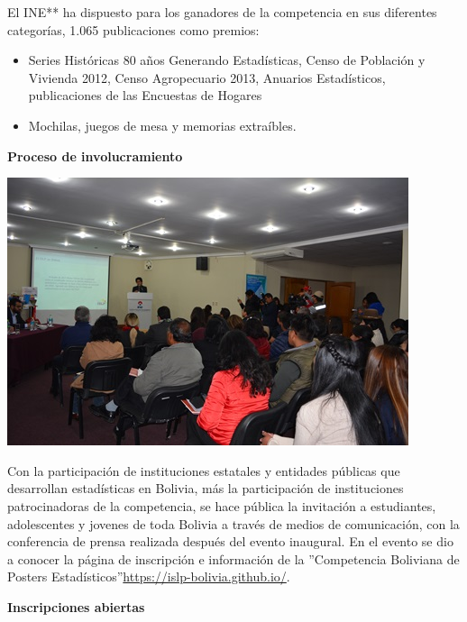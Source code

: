 \documentclass[8pt,a4paper]{article} %
\newcommand{\NewsItem}[1]{ %
\usefont{T1}{fvs}{n}{n} %
\vspace{24pt}\large #1\vspace{3pt} %
\par \normalsize \normalfont}
\begin{document}
\begin{multicols}{2}
El INE** ha dispuesto para los ganadores de la competencia en sus diferentes categorías, 1.065
 publicaciones como premios: 

\begin{multicols}{2}
\begin{small}
\begin{itemize}
\item Series Históricas 80 años Generando Estadísticas, Censo de Población y Vivienda 2012, Censo Agropecuario 2013, Anuarios Estadísticos, publicaciones de las Encuestas de Hogares
\item Mochilas, juegos de mesa y memorias extraíbles.
\end{itemize}
\end{small}
\end{multicols}

\NewsItem{\textbf{Proceso de involucramiento}}

\begin{center}
\includegraphics[scale=0.15]{foto4.jpg} %
\end{center}

Con la participación de instituciones estatales y entidades públicas que desarrollan estadísticas en Bolivia, más la participación de instituciones patrocinadoras de la competencia, se hace pública la invitación a estudiantes, adolescentes y jovenes de toda Bolivia a través de medios de comunicación, con la conferencia de prensa realizada después del evento inaugural. En el evento se dio a conocer la página de inscripción e información de la ''Competencia Boliviana de Posters Estadísticos''\url{https://islp-bolivia.github.io/}.


\NewsItem{\textbf{Inscripciones abiertas}}


\end{multicols}
\end{document}
